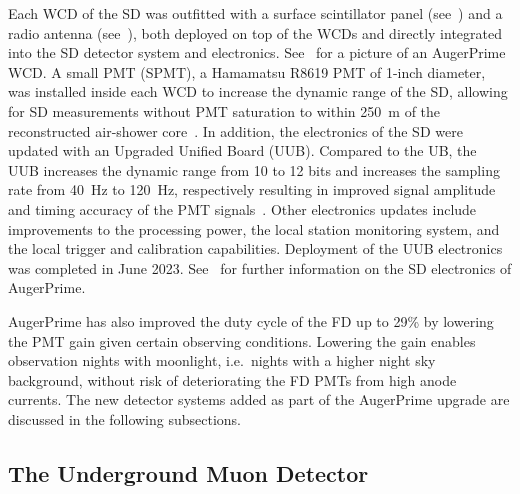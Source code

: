 Each WCD of the SD was outfitted with a surface scintillator panel (see~) and a radio antenna (see~), both deployed on top of the WCDs and directly integrated into the SD detector system and electronics.
See~ for a picture of an AugerPrime WCD.
A small PMT (SPMT), a Hamamatsu R8619 PMT of 1-inch diameter, was installed inside each WCD to increase the dynamic range of the SD, allowing for SD measurements without PMT saturation to within \qty{250}{\meter} of the reconstructed air-shower core~\cite{auger_icrc2023_dynamicrange}.
In addition, the electronics of the SD were updated with an Upgraded Unified Board (UUB).
Compared to the UB, the UUB increases the dynamic range from 10 to 12 bits and increases the sampling rate from \qty{40}{\hertz} to \qty{120}{\hertz}, respectively resulting in improved signal amplitude and timing accuracy of the PMT signals~\cite{augerprime_pdr}.
Other electronics updates include improvements to the processing power, the local station monitoring system, and the local trigger and calibration capabilities.
Deployment of the UUB electronics was completed in June 2023.
See~\cite{auger_jinst2023_sdeu} for further information on the SD electronics of AugerPrime.

AugerPrime has also improved the duty cycle of the FD up to 29\% by lowering the PMT gain given certain observing conditions.
Lowering the gain enables observation nights with moonlight, i.e.~nights with a higher night sky background, without risk of deteriorating the FD PMTs from high anode currents.
The new detector systems added as part of the AugerPrime upgrade are discussed in the following subsections.





\subsection{The Underground Muon Detector}\label{ssec:umd}

